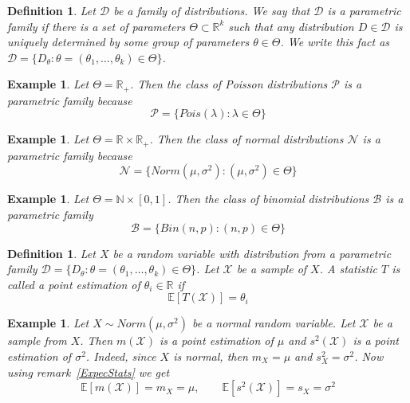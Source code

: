 \documentclass[12pt]{article}
\newtheorem{definition}[theorem]{Definition}
\newtheorem{example}[theorem]{Example}
\begin{document}
\begin{definition} Let $\mathcal{D}$ be a family of distributions. We say that
    $\mathcal{D}$ is a parametric family if there is a set of parameters
    $\Theta\subset\mathbb{R}^k$ such that any distribution $D\in\mathcal{D}$ is
    uniquely determined by some group of parameters $\theta\in\Theta$. We write
    this fact as
    $\mathcal{D}=\{D_\theta:\theta=(\theta_1,\ldots,\theta_k)\in\Theta \}$.
\end{definition}

\begin{example} Let $\Theta=\mathbb{R}_+$. Then the class of Poisson
    distributions $\mathcal{P}$ is a parametric family because
    $$
        \mathcal{P}=\{Pois(\lambda):\lambda\in\Theta \}
    $$
\end{example}

\begin{example} Let $\Theta=\mathbb{R}\times\mathbb{R}_+$. Then the class of
    normal distributions $\mathcal{N}$ is a parametric family because
    $$
        \mathcal{N}=\{Norm(\mu,\sigma^2): (\mu,\sigma^2)\in\Theta \}
    $$
\end{example}

\begin{example} Let $\Theta=\mathbb{N}\times[0,1]$. Then the class of binomial
    distributions $\mathcal{B}$ is a parametric family
    $$
        \mathcal{B}=\{Bin(n,p):(n,p)\in\Theta \}
    $$
\end{example}

\begin{definition} Let $X$ be a random variable with distribution from a
    parametric family
    $\mathcal{D}=\{D_\theta:\theta=(\theta_1,\ldots,\theta_k)\in\Theta \}$. Let
    $\mathscr{X}$ be a sample of $X$. A statistic $T$ is called a point
    estimation of $\theta_i\in\mathbb{R}$ if
    $$
        \mathbb{E}[T(\mathscr{X})]=\theta_i
    $$
\end{definition}

\begin{example} Let $X\sim Norm(\mu,\sigma^2)$ be a normal random variable. Let
    $\mathscr{X}$ be a sample from $X$. Then $m(\mathscr{X})$ is a point
    estimation of $\mu$ and $s^2(\mathscr{X})$ is a point estimation of
    $\sigma^2$. Indeed, since $X$ is normal, then $m_X=\mu$ and
    $s_X^2=\sigma^2$. Now using remark~\ref{ExpecStats} we get
    $$
        \mathbb{E}[m(\mathscr{X})]=m_X=\mu,
        \quad\quad
        \mathbb{E}[s^2(\mathscr{X})]=s_X=\sigma^2
    $$
\end{example}
\end{document}
